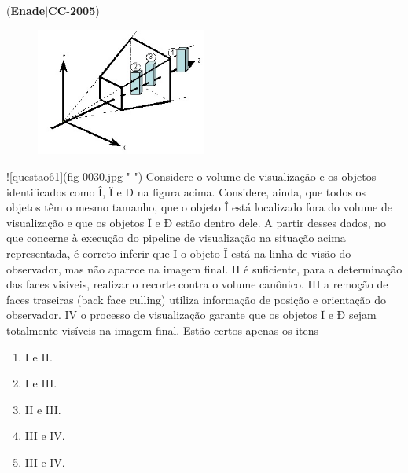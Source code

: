 \documentclass{exam}
\begin{document}
\begin{questions}
\question (\textbf{Enade}$|$\textbf{CC}-\textbf{2005}) \begin{figure}[H]
	\begin{center}
		\includegraphics[width=0.5\textwidth]{CIENCIA_DA_COMPUTACAO_Prova2005-utf8_figuras/fig-0030.jpg}
		\caption{ }
	\end{center}
\end{figure}
![questao61](fig-0030.jpg " ")
Considere o volume de visualização e os objetos identificados
como Î, Ï e Ð na figura acima. Considere, ainda, que todos os
objetos têm o mesmo tamanho, que o objeto Î está localizado fora
do volume de visualização e que os objetos Ï e Ð estão dentro
dele. A partir desses dados, no que concerne à execução do
pipeline de visualização na situação acima representada, é correto
inferir que
I o objeto Î está na linha de visão do observador, mas não
aparece na imagem final.
II é suficiente, para a determinação das faces visíveis, realizar o
recorte contra o volume canônico.
III a remoção de faces traseiras (back face culling) utiliza
informação de posição e orientação do observador.
IV o processo de visualização garante que os objetos Ï e Ð sejam
totalmente visíveis na imagem final.
Estão certos apenas os itens
	\begin{enumerate}[label=\alph*)]
		\item  I e II.
		\item  I e III.
		\item  II e III.
		\item  III e IV.
		\item  III e IV.

	\end{enumerate}


\end{questions}
\end{document}
